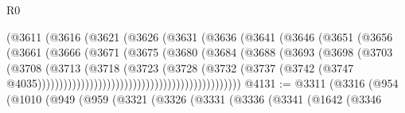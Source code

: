 \begin{lexlean}{R0}
\begin{coremodule}
                                        (@3611
                                          (@3616
                                            (@3621
                                              (@3626
                                                (@3631
                                                  (@3636
                                                    (@3641
                                                      (@3646
                                                        (@3651
                                                          (@3656
                                                            (@3661
                                                              (@3666
                                                                (@3671
                                                                  (@3675
                                                                    (@3680
                                                                      (@3684
                                                                        (@3688
                                                                          (@3693
                                                                            (@3698
                                                                              (@3703
                                                                                (@3708
                                                                                  (@3713
                                                                                    (@3718
                                                                                      (@3723
                                                                                        (@3728
                                                                                          (@3732
                                                                                            (@3737
                                                                                              (@3742
                                                                                                (@3747
                                                                                                  @4035)))))))))))))))))))))))))))))))))))))))))))))))
@4131 := @3311
    (@3316
      (@954
        (@1010
          (@949
            (@959
              (@3321
                (@3326
                  (@3331
                    (@3336
                      (@3341
                        (@1642
                          (@3346

\end{coremodule}
\end{lexlean}
